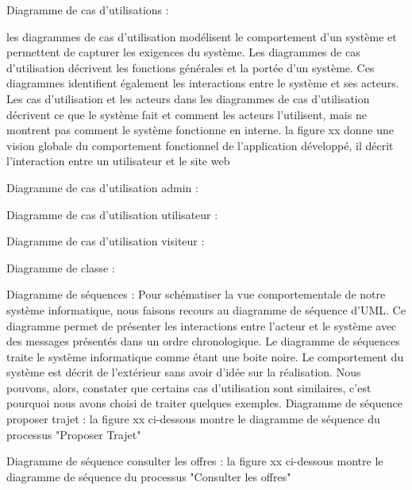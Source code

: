 \documentclass[a4paper]{report}
\begin{document}
\begin{spacing}{2}
Diagramme de cas d’utilisations :

les diagrammes de cas d'utilisation modélisent le comportement d'un système et permettent de capturer les exigences du système. Les diagrammes de cas d'utilisation décrivent
les fonctions générales et la portée d'un système. Ces diagrammes identifient également les
interactions entre le système et ses acteurs. Les cas d'utilisation et les acteurs dans les diagrammes de cas d'utilisation décrivent ce que le système fait et comment les acteurs l'utilisent,
mais ne montrent pas comment le système fonctionne en interne.
la figure xx donne une vision globale du comportement fonctionnel de l'application développé, il décrit l'interaction entre un utilisateur et le site web

Diagramme de cas d’utilisation admin :

 


Diagramme de cas d’utilisation utilisateur :

 








Diagramme de cas d’utilisation visiteur :
 
Diagramme de classe :

 


Diagramme de séquences :
Pour schématiser la vue comportementale de notre système informatique, nous faisons recours au diagramme de séquence d'UML. Ce diagramme permet de présenter les interactions
entre l'acteur et le système avec des messages présentés dans un ordre chronologique. Le
diagramme de séquences traite le système informatique comme étant une boite noire. Le
comportement du système est décrit de l'extérieur sans avoir d'idée sur la réalisation. Nous
pouvons, alors, constater que certains cas d'utilisation sont similaires, c'est pourquoi nous
avons choisi de traiter quelques exemples.
Diagramme de séquence proposer trajet :
la figure xx ci-dessous montre le diagramme de séquence du processus "Proposer Trajet"
 




Diagramme de séquence consulter les offres :
la figure xx ci-dessous montre le diagramme de séquence du processus "Consulter les offres"



 











\end{spacing}
\end{document}
